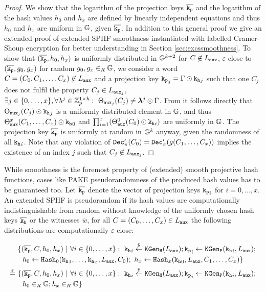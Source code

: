 \begin{proof}
We show that the logarithm of the projection keys $\overline{\mathtt{k_p}}$ and the logarithm of the hash values $h_0$ and $h_x$ are defined by linearly independent equations and thus $h_0$ and $h_x$ are uniform in $\mathbb{G}$, given $\overline{\mathtt{k_p}}$.
In addition to this general proof we give an extended proof of extended \ac{SPHF} smoothness instantiated with labelled Cramer-Shoup encryption for better understanding in Section \ref{sec:excssmoothness}.
To show that $(\overline{\mathtt{k_p}},h_0,h_x)$ is uniformly distributed in $\mathbb{G}^{k+2}$ for $C\not\in L_\mathtt{aux}$, \ie $\varepsilon$-close to $(\overline{\mathtt{k_p}},g_0,g_x)$ for random $g_0,g_x\in_R\mathbb{G}$, we consider a word $C=(C_0,C_1,\dots,C_x)\not\in L_\mathtt{aux}$ and a projection key $\mathtt{k_p}_j=\Gamma \odot \mathtt{k_h}_j$ such that one $C_j$ does not fulfil the property $C_j\in L_{\mathtt{aux}_j}$, \ie $\exists j\in\{0,\dots,x\},\forall\lambda^j\in\mathbb{Z}_p^{1\times k}:~\Theta_{\mathtt{aux}_j}(C_j)\not=\bm{\lambda}^j\odot \Gamma$.
From \cite[Appendix D.3]{cryptoeprint:2013:034} it follows directly that $\Theta_{\mathtt{aux}_j}(C_j)\odot\mathtt{k_h}_j$ is a uniformly distributed element in $\mathbb{G}$, and thus $\Theta^x_{\mathtt{aux}}(C_1,\dots,C_x)\odot\mathtt{k_h}_0$ and $\prod^{x}_{i=1}(\Theta_{\mathtt{aux}}^0(C_0)\odot\mathtt{k_h}_i)$ are uniformly in $\mathbb{G}$.
The projection key $\overline{\mathtt{k_p}}$ is uniformly at random in $\mathbb{G}^{k}$ anyway, given the randomness of all $\mathtt{k_h}_i$.
Note that any violation of $\mathtt{Dec}'_{\pi}(C_0)=\mathtt{Dec}'_{\pi}(g(C_1,\dots,C_x))$ implies the existence of an index $j$ such that $C_j\not\in L_{\mathtt{aux}_j}$.
\end{proof}

\noindent
While smoothness is the foremost property of (extended) smooth projective hash functions, cases like \ac{PAKE} pseudorandomness of the produced hash values has to be guaranteed too.
Let $\overline{\mathtt{k_p}}$ denote the vector of projection keys $\mathtt{k_p}_i$ for $i=0,\dots,x$.
An extended \ac{SPHF} is pseudorandom if its hash values are computationally indistinguishable from random without knowledge of the uniformly chosen hash keys $\overline{\mathtt{k_h}}$ or the witnesses $\overline{w}$, \ie for all $C=(C_0,\dots,C_x)\in L_\mathtt{aux}$ the following distributions are computationally $\varepsilon$-close:

\begin{align*}
& \{(\overline{\mathtt{k_p}},C,h_0,h_x) ~|~ \forall i\in\{0,\dots,x\}:~ \mathtt{k_h}_i\stackrel{\$}{\gets}\mathtt{KGen_H}(L_\mathtt{aux}); \mathtt{k_p}_i\gets\mathtt{KGen_P}(\mathtt{k_h}_i,L_\mathtt{aux}); \\
& ~~h_0\gets\mathtt{Hash}_0(\mathtt{k_h}_1,\dots,\mathtt{k_h}_x,L_\mathtt{aux},C_0);~ h_x\gets\mathtt{Hash}_x(\mathtt{k_h}_0,L_\mathtt{aux},C_1,\dots,C_x)\} \\
\stackrel{\varepsilon}{=}~ & \{(\overline{\mathtt{k_p}},C,h_0,h_x) ~|~ \forall i\in\{0,\dots,x\}:~ \mathtt{k_h}_i\stackrel{\$}{\gets}\mathtt{KGen_H}(L_\mathtt{aux}); \mathtt{k_p}_i\gets\mathtt{KGen_P}(\mathtt{k_h}_i,L_\mathtt{aux}); \\
& ~~ h_0\in_R\mathbb{G}; h_x\in_R\mathbb{G}\}
\end{align*}

